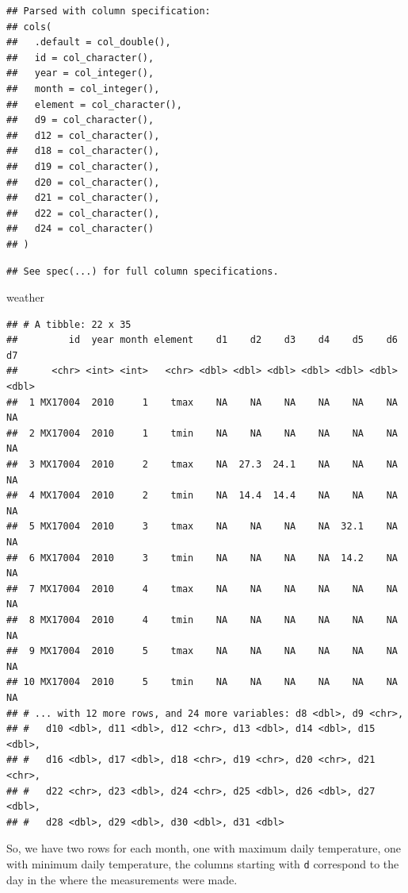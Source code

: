 \documentclass[12pt,]{book}
\newenvironment{Shaded}{\begin{snugshade}}{\end{snugshade}}
\newcommand{\NormalTok}[1]{#1}
\theoremstyle{definition}
\theoremstyle{definition}
\theoremstyle{remark}
\begin{document}
\begin{verbatim}
## Parsed with column specification:
## cols(
##   .default = col_double(),
##   id = col_character(),
##   year = col_integer(),
##   month = col_integer(),
##   element = col_character(),
##   d9 = col_character(),
##   d12 = col_character(),
##   d18 = col_character(),
##   d19 = col_character(),
##   d20 = col_character(),
##   d21 = col_character(),
##   d22 = col_character(),
##   d24 = col_character()
## )
\end{verbatim}

\begin{verbatim}
## See spec(...) for full column specifications.
\end{verbatim}

\begin{Shaded}
\begin{Highlighting}[]
\NormalTok{weather}
\end{Highlighting}
\end{Shaded}

\begin{verbatim}
## # A tibble: 22 x 35
##         id  year month element    d1    d2    d3    d4    d5    d6    d7
##      <chr> <int> <int>   <chr> <dbl> <dbl> <dbl> <dbl> <dbl> <dbl> <dbl>
##  1 MX17004  2010     1    tmax    NA    NA    NA    NA    NA    NA    NA
##  2 MX17004  2010     1    tmin    NA    NA    NA    NA    NA    NA    NA
##  3 MX17004  2010     2    tmax    NA  27.3  24.1    NA    NA    NA    NA
##  4 MX17004  2010     2    tmin    NA  14.4  14.4    NA    NA    NA    NA
##  5 MX17004  2010     3    tmax    NA    NA    NA    NA  32.1    NA    NA
##  6 MX17004  2010     3    tmin    NA    NA    NA    NA  14.2    NA    NA
##  7 MX17004  2010     4    tmax    NA    NA    NA    NA    NA    NA    NA
##  8 MX17004  2010     4    tmin    NA    NA    NA    NA    NA    NA    NA
##  9 MX17004  2010     5    tmax    NA    NA    NA    NA    NA    NA    NA
## 10 MX17004  2010     5    tmin    NA    NA    NA    NA    NA    NA    NA
## # ... with 12 more rows, and 24 more variables: d8 <dbl>, d9 <chr>,
## #   d10 <dbl>, d11 <dbl>, d12 <chr>, d13 <dbl>, d14 <dbl>, d15 <dbl>,
## #   d16 <dbl>, d17 <dbl>, d18 <chr>, d19 <chr>, d20 <chr>, d21 <chr>,
## #   d22 <chr>, d23 <dbl>, d24 <chr>, d25 <dbl>, d26 <dbl>, d27 <dbl>,
## #   d28 <dbl>, d29 <dbl>, d30 <dbl>, d31 <dbl>
\end{verbatim}

So, we have two rows for each month, one with maximum daily temperature,
one with minimum daily temperature, the columns starting with \texttt{d}
correspond to the day in the where the measurements were made.
\end{document}
